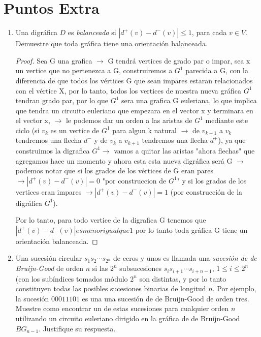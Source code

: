 \documentclass{article}
\begin{document}
\section*{Puntos Extra}
\begin{enumerate}
\item Una digr\'afica $D$ es {\em balanceada} si $|d^+(v) - d^-(v)|
  \le 1$, para cada $v \in V$.   Demuestre que toda gr\'afica tiene
  una orientaci\'on balanceada.

  \begin{proof} 


    Sea G una grafica $\rightarrow$ G tendrá vertices de grado par o impar, sea x un vertice que no pertenezca a G, construiremos a $G^1$ parecida a G, con la diferencia de que todos los vértices G que sean impares estaran relacionados con el vértice X, por lo tanto, todos los vertices de nuestra nueva gráfica $G^1$ tendran grado par, por lo que $G^1$ sera una grafica G euleriana, lo que implica que tendra un circuito euleriano que empezara en el vector x y terminara en el vector x, $\rightarrow$ le podemos dar un orden a las aristas de $G^1$ mediante este ciclo (si $v_k$ es un vertice de $G^1$ para algun k natural  $\rightarrow$ de $v_{k-1}$ a $v_k$ tendremos una flecha  $d^-$ y de $v_{k}$ a $v_{k+1}$ tendremos una flecha $d^+$), ya que construimos la digrafica $G^1\rightarrow$ vamos a quitar las aristas "ahora flechas" que agregamos hace un momento y ahora esta esta nueva digráfica  será G $\rightarrow$ podemos notar que si los grados de los vértices de G eran pares $\rightarrow|d^+(v) - d^-(v)| = 0$ "por construccion de $G^1$" y si los grados de los vertices eran impares $\rightarrow |d^+(v) - d^-(v)|=1$ (por construcción de la digráfica $G^1$).
    
    Por lo tanto, para todo vertice de la digrafica G tenemos que $|d^+(v) - d^-(v)| es menor igual que 1$ por lo tanto toda gráfica G tiene un orientación balanceada.
    
    \end{proof}
    



\item Una sucesi\'on circular $s_1 s_2 \cdots s_{2^n}$ de ceros
  y unos es llamada una {\em sucesi\'on de de Bruijn-Good}
  de orden $n$ si las $2^n$ subsucesiones $s_i s_{i+1} \cdots
  s_{i+n-1}$, $1 \le i \le 2^n$ (con los sub\'indices tomados
  m\'odulo $2^n$ son distintas, y por lo tanto constituyen todas
  las posibles sucesiones binarias de longitud $n$.   Por ejemplo,
  la sucesi\'on $00011101$ es una una sucesi\'on de de Bruijn-Good
  de orden tres.   Muestre como encontrar un de estas sucesiones
  para cualquier orden $n$ utilizando un circuito euleriano dirigido
  en la gr\'afica de de Bruijn-Good $BG_{n-1}$. Justifique su
  respuesta.


\end{enumerate}
\end{document}
